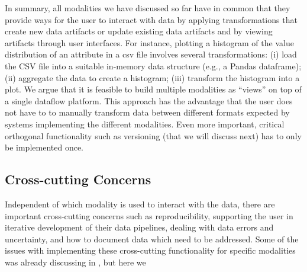 In summary, all modalities we have discussed so far have in common that they provide ways for the user to interact with data by applying transformations that create new data artifacts or update existing data artifacts and by viewing artifacts through user interfaces. For instance, plotting a histogram of the value distribution of an attribute in a csv file involves several transformations: (i) load the CSV file into a suitable in-memory data structure (e.g., a Pandas dataframe); (ii) aggregate the data to create a histogram; (iii) transform the histogram into a plot. We argue that it is feasible to build multiple modalities as ``views'' on top of a single dataflow platform. This approach has the advantage that the user does not have to to manually transform data between different formats expected by systems implementing the different modalities. Even more important, critical orthogonal functionality  such as versioning (that we will discuss next) has to only be implemented once.

\subsection{Cross-cutting Concerns}
\label{sec:cross-cutt-conc}

Independent of which modality is used to interact with the data, there are important cross-cutting concerns such as reproducibility, supporting the user in iterative development of their data pipelines, dealing with data errors and uncertainty, and how to document data which need to be addressed. Some of the issues with implementing these cross-cutting functionality for specific modalities was already discussing in , but here we

